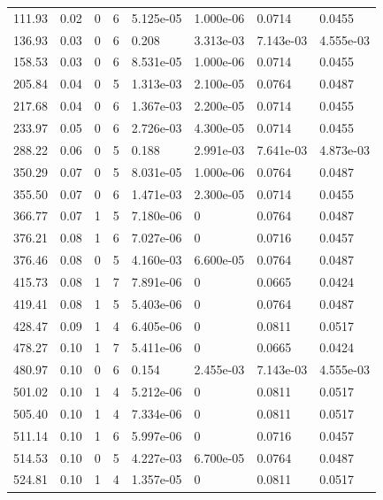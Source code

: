\documentclass[preview]{standalone}
\begin{document}
{{\begin{tabular}{L{1.2cm}C{1.2cm} C{0.3cm}C{0.5cm} C{1.4cm}C{1.4cm} C{1.4cm}C{1.4cm}}
  111.93  &  0.02  & 0     &  6 &  5.125e-05  & 1.000e-06  & 0.0714 &  0.0455   \\ 
  136.93  &  0.03  & 0     &  6 &  0.208  & 3.313e-03  & 7.143e-03 &  4.555e-03   \\ 
  158.53  &  0.03  & 0     &  6 &  8.531e-05  & 1.000e-06  & 0.0714 &  0.0455   \\ 
  205.84  &  0.04  & 0     &  5 &  1.313e-03  & 2.100e-05  & 0.0764 &  0.0487   \\ 
  217.68  &  0.04  & 0     &  6 &  1.367e-03  & 2.200e-05  & 0.0714 &  0.0455   \\ 
  233.97  &  0.05  & 0     &  6 &  2.726e-03  & 4.300e-05  & 0.0714 &  0.0455   \\ 
  288.22  &  0.06  & 0     &  5 &  0.188  & 2.991e-03  & 7.641e-03 &  4.873e-03   \\ 
  350.29  &  0.07  & 0     &  5 &  8.031e-05  & 1.000e-06  & 0.0764 &  0.0487   \\ 
  355.50  &  0.07  & 0     &  6 &  1.471e-03  & 2.300e-05  & 0.0714 &  0.0455   \\ 
  366.77  &  0.07  & 1     &  5 &  7.180e-06  & 0  & 0.0764 &  0.0487   \\ 
  376.21  &  0.08  & 1     &  6 &  7.027e-06  & 0  & 0.0716 &  0.0457   \\ 
  376.46  &  0.08  & 0     &  5 &  4.160e-03  & 6.600e-05  & 0.0764 &  0.0487   \\ 
  415.73  &  0.08  & 1     &  7 &  7.891e-06  & 0  & 0.0665 &  0.0424   \\ 
  419.41  &  0.08  & 1     &  5 &  5.403e-06  & 0  & 0.0764 &  0.0487   \\ 
  428.47  &  0.09  & 1     &  4 &  6.405e-06  & 0  & 0.0811 &  0.0517   \\ 
  478.27  &  0.10  & 1     &  7 &  5.411e-06  & 0  & 0.0665 &  0.0424   \\ 
  480.97  &  0.10  & 0     &  6 &  0.154  & 2.455e-03  & 7.143e-03 &  4.555e-03   \\ 
  501.02  &  0.10  & 1     &  4 &  5.212e-06  & 0  & 0.0811 &  0.0517   \\ 
  505.40  &  0.10  & 1     &  4 &  7.334e-06  & 0  & 0.0811 &  0.0517   \\ 
  511.14  &  0.10  & 1     &  6 &  5.997e-06  & 0  & 0.0716 &  0.0457   \\ 
  514.53  &  0.10  & 0     &  5 &  4.227e-03  & 6.700e-05  & 0.0764 &  0.0487   \\ 
  524.81  &  0.10  & 1     &  4 &  1.357e-05  & 0  & 0.0811 &  0.0517   \\ 

\end{tabular}}}
\end{document}
